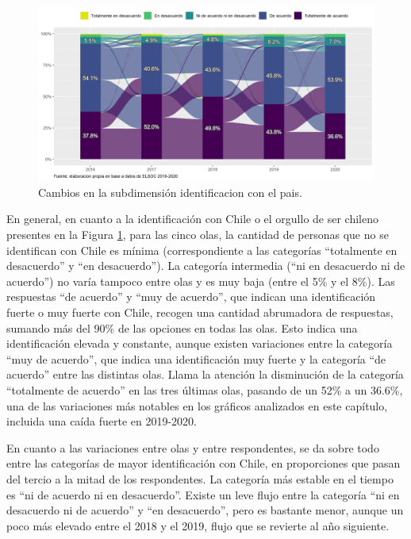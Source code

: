 \documentclass[
  12pt,
]{book}
\begin{document}
\begin{figure}[H]

{\centering \includegraphics[width=1\linewidth,height=1\textheight]{output/graphs/alluvial_identificacion} 

}

\caption{Cambios en la subdimensión identificacion con el pais.}\label{fig:alluvial-identificacion}
\end{figure}

En general, en cuanto a la identificación con Chile o el orgullo de ser chileno presentes en la Figura \ref{fig:alluvial-identificacion}, para las cinco olas, la cantidad de personas que no se identifican con Chile es mínima (correspondiente a las categorías ``totalmente en desacuerdo'' y ``en desacuerdo''). La categoría intermedia (``ni en desacuerdo ni de acuerdo'') no varía tampoco entre olas y es muy baja (entre el 5\% y el 8\%). Las respuestas ``de acuerdo'' y ``muy de acuerdo'', que indican una identificación fuerte o muy fuerte con Chile, recogen una cantidad abrumadora de respuestas, sumando más del 90\% de las opciones en todas las olas. Esto indica una identificación elevada y constante, aunque existen variaciones entre la categoría ``muy de acuerdo'', que indica una identificación muy fuerte y la categoría ``de acuerdo'' entre las distintas olas. Llama la atención la disminución de la categoría ``totalmente de acuerdo'' en las tres últimas olas, pasando de un 52\% a un 36.6\%, una de las variaciones más notables en los gráficos analizados en este capítulo, incluida una caída fuerte en 2019-2020.

En cuanto a las variaciones entre olas y entre respondentes, se da sobre todo entre las categorías de mayor identificación con Chile, en proporciones que pasan del tercio a la mitad de los respondentes. La categoría más estable en el tiempo es ``ni de acuerdo ni en desacuerdo''. Existe un leve flujo entre la categoría ``ni en desacuerdo ni de acuerdo'' y ``en desacuerdo'', pero es bastante menor, aunque un poco más elevado entre el 2018 y el 2019, flujo que se revierte al año siguiente.
\end{document}
